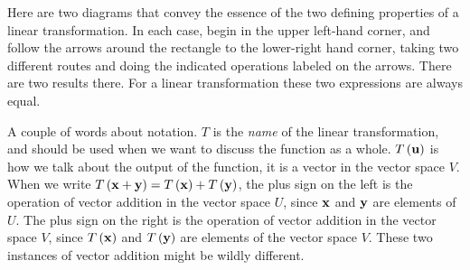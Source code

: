 \documentclass{ximera}
\begin{document}
Here are two diagrams that convey the essence of the two defining
properties of a linear transformation.  In each case, begin in the
upper left-hand corner, and follow the arrows around the rectangle to
the lower-right hand corner, taking two different routes and doing the
indicated operations labeled on the arrows.  There are two results
there.  For a linear transformation these two expressions are always
equal.

A couple of words about notation.  $T$ is the \textit{name} of the
linear transformation, and should be used when we want to discuss the
function as a whole.  $T\left(\mathbf{u}\right)$ is how we talk about the
output of the function, it is a vector in the vector space $V$.  When
we write
$T\left(\mathbf{x}+\mathbf{y}\right)=T\left(\mathbf{x}\right)+T\left(\mathbf{y}\right)$, the
plus sign on the left is the operation of vector addition in the
vector space $U$, since $\mathbf{x}$ and $\mathbf{y}$ are elements of $U$.
The plus sign on the right is the operation of vector addition in the
vector space $V$, since $T\left(\mathbf{x}\right)$ and $T\left(\mathbf{y}\right)$ are
elements of the vector space $V$.  These two instances of vector
addition might be wildly different.
\end{document}
